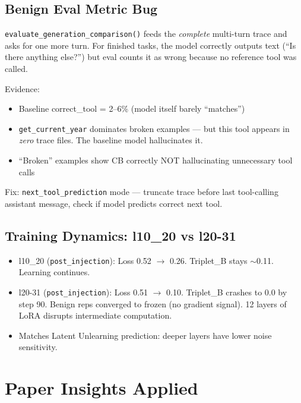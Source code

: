 \documentclass[11pt]{article}
\newcommand{\bad}[1]{\textcolor{bad}{#1}}
\begin{document}
\subsection{Benign Eval Metric Bug}
\texttt{evaluate\_generation\_comparison()} feeds the \emph{complete} multi-turn trace and asks for one more turn. For finished tasks, the model correctly outputs text (``Is there anything else?'') but eval counts it as wrong because no reference tool was called.

Evidence:
\begin{itemize}
  \item Baseline correct\_tool = 2--6\% (model itself barely ``matches'')
  \item \texttt{get\_current\_year} dominates broken examples --- but this tool appears in \emph{zero} trace files. The baseline model hallucinates it.
  \item ``Broken'' examples show CB correctly NOT hallucinating unnecessary tool calls
\end{itemize}

Fix: \texttt{next\_tool\_prediction} mode --- truncate trace before last tool-calling assistant message, check if model predicts correct next tool.

\subsection{Training Dynamics: l10\_20 vs l20-31}
\begin{itemize}
  \item l10\_20 (\texttt{post\_injection}): Loss 0.52 $\to$ 0.26. Triplet\_B stays $\sim$0.11. Learning continues.
  \item l20-31 (\texttt{post\_injection}): Loss 0.51 $\to$ 0.10. \bad{Triplet\_B crashes to 0.0 by step 90}. Benign reps converged to frozen (no gradient signal). 12 layers of LoRA disrupts intermediate computation.
  \item Matches Latent Unlearning prediction: deeper layers have lower noise sensitivity.
\end{itemize}

\section{Paper Insights Applied}
\end{document}
